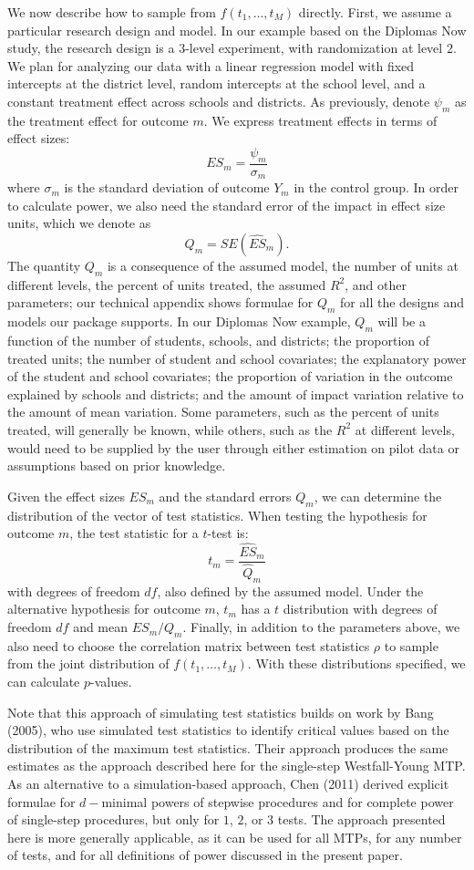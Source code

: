 \documentclass[
]{article}
\begin{document}
We now describe how to sample from \(f(t_1, \dots, t_M)\) directly.
First, we assume a particular research design and model. In our example
based on the Diplomas Now study, the research design is a \(3\)-level
experiment, with randomization at level \(2\). We plan for analyzing our
data with a linear regression model with fixed intercepts at the
district level, random intercepts at the school level, and a constant
treatment effect across schools and districts. As previously, denote
\(\psi_m\) as the treatment effect for outcome \(m\). We express
treatment effects in terms of effect sizes:
\[ES_m = \frac{\psi_m}{\sigma_{m}}\] where \(\sigma_{m}\) is the
standard deviation of outcome \(Y_m\) in the control group. In order to
calculate power, we also need the standard error of the impact in effect
size units, which we denote as \[Q_m = SE(\hat{ES}_m).\] The quantity
\(Q_m\) is a consequence of the assumed model, the number of units at
different levels, the percent of units treated, the assumed \(R^2\), and
other parameters; our technical appendix shows formulae for \(Q_m\) for
all the designs and models our package supports. In our Diplomas Now
example, \(Q_m\) will be a function of the number of students, schools,
and districts; the proportion of treated units; the number of student
and school covariates; the explanatory power of the student and school
covariates; the proportion of variation in the outcome explained by
schools and districts; and the amount of impact variation relative to
the amount of mean variation. Some parameters, such as the percent of
units treated, will generally be known, while others, such as the
\(R^2\) at different levels, would need to be supplied by the user
through either estimation on pilot data or assumptions based on prior
knowledge.

Given the effect sizes \(ES_m\) and the standard errors \(Q_m\), we can
determine the distribution of the vector of test statistics. When
testing the hypothesis for outcome \(m\), the test statistic for a
\(t\)-test is: \[t_m = \frac{\hat{ES}_m}{\hat{Q}_m}\] with degrees of
freedom \(df\), also defined by the assumed model. Under the alternative
hypothesis for outcome \(m\), \(t_m\) has a \(t\) distribution with
degrees of freedom \(df\) and mean \(ES_m/Q_m\). Finally, in addition to
the parameters above, we also need to choose the correlation matrix
between test statistics \(\rho\) to sample from the joint distribution
of \(f(t_1, \dots, t_M)\). With these distributions specified, we can
calculate \(p\)-values.

Note that this approach of simulating test statistics builds on work by
Bang (2005), who use simulated test statistics to identify critical
values based on the distribution of the maximum test statistics. Their
approach produces the same estimates as the approach described here for
the single-step Westfall-Young MTP. As an alternative to a
simulation-based approach, Chen (2011) derived explicit formulae for
\(d-\)minimal powers of stepwise procedures and for complete power of
single-step procedures, but only for \(1\), \(2\), or \(3\) tests. The
approach presented here is more generally applicable, as it can be used
for all MTPs, for any number of tests, and for all definitions of power
discussed in the present paper.
\end{document}

